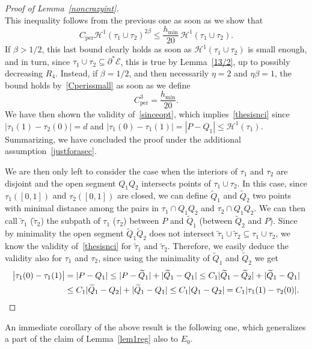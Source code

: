 \documentclass[10pt]{amsart}
\newcommand\Ceeb{C_\mathrm{per}}
\newcommand\E{\mathcal{E}}
\renewcommand\H{\mathcal{H}}
\theoremstyle{plain}
\theoremstyle{definition}
\begin{document}
\begin{proof}[Proof of Lemma~\ref{noncrazyint}]
\begin{equation}
\end{equation}
This inequality follows from the previous one as soon as we show that
\[
\Ceeb \H^1(\tau_1 \cup\tau_2)^{2\beta} \leq \frac{h_{\min}}{20}\,\H^1(\tau_1 \cup\tau_2).
\]
If $\beta>1/2$, this last bound clearly holds as soon as $\H^1(\tau_1 \cup\tau_2)$ is small enough, and in turn, since $\tau_1\cup\tau_2\subseteq\partial^*\E$, this is true by Lemma~\ref{13/2}, up to possibly decreasing $R_4$. Instead, if $\beta=1/2$, and then necessarily $\eta=2$ and $\eta\beta=1$, the bound holds by~\eqref{Cperissmall} as soon as we define
\begin{equation}\label{ceeb3}
\Ceeb^3=\frac{h_{\min}}{20}.
\end{equation}
We have then shown the validity of~\eqref{sinceopt}, which implies~\eqref{thesisnci} since $|\tau_1(1)-\tau_2(0)|=d$ and $|\tau_1(0)-\tau_1(1)|=|P-Q_1|\leq \H^1(\tau_1)$. Summarizing, we have concluded the proof under the additional assumption~\eqref{justforasec}.

We are then only left to consider the case when the interiors of $\tau_1$ and $\tau_2$ are disjoint and the open segment $Q_1Q_2$ intersects points of $\tau_1\cup\tau_2$. In this case, since $\tau_1([0,1])$ and $\tau_2([0,1])$ are closed, we can define $\widetilde Q_1$ and $\widetilde Q_2$ two points with minimal distance among the pairs in $\tau_1\cap Q_1Q_2$ and $\tau_2\cap Q_1Q_2$. We can then call $\tilde \tau_1$ (\resp $\tilde\tau_2$) the subpath of $\tau_1$ (\resp $\tau_2$) between $P$ and $\widetilde Q_1$ (\resp between $\widetilde Q_2$ and $P$). Since by minimality the open segment $\widetilde Q_1\widetilde Q_2$ does not intersect $\tilde\tau_1\cup\tilde\tau_2 \subseteq \tau_1\cup\tau_2$, we know the validity of~\eqref{thesisnci} for $\tilde\tau_1$ and $\tilde\tau_2$. Therefore, we easily deduce the validity also for $\tau_1$ and $\tau_2$, since using the minimality of $\widetilde Q_1$ and $\widetilde Q_2$ we get
\begin{align*}
\big|\tau_1(0)-\tau_1(1)\big| &= |P-Q_1|
\leq |P-\widetilde Q_1| + |\widetilde Q_1 - Q_1|
\leq C_1 |\widetilde Q_1 - \widetilde Q_2 | + |\widetilde Q_1 - Q_1|\\
&\leq C_1 |\widetilde Q_1 - Q_2 | + |\widetilde Q_1 - Q_1|
\leq
C_1 |Q_1-Q_2| = C_1 |\tau_1(1)-\tau_2(0)|.\qedhere
\end{align*}
\end{proof}

An immediate corollary of the above result is the following one, which generalizes a part of the claim of Lemma~\ref{lem1reg} also to $E_0$.
\end{document}
